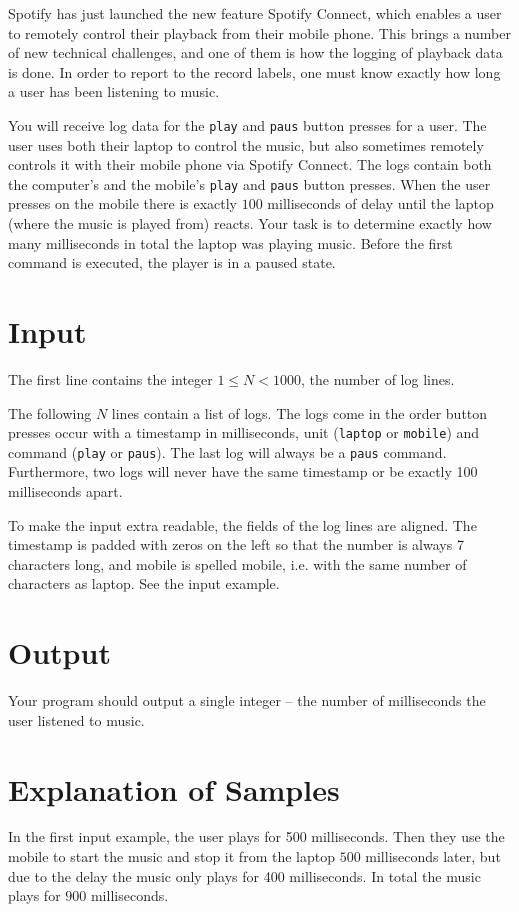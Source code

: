 
Spotify has just launched the new feature Spotify Connect, which enables a
user to remotely control their playback from their mobile phone. This brings a
number of new technical challenges, and one of them is how the logging of playback data is done.
In order to report to the record labels, one must know exactly how long
a user has been listening to music.

You will receive log data for the \texttt{play} and \texttt{paus} button presses
for a user. The user uses both their laptop to control the music, but
also sometimes remotely controls it with their mobile phone via Spotify Connect. The logs contain both
the computer's and the mobile's \texttt{play} and \texttt{paus} button presses. When the user presses
on the mobile there is exactly $100$ milliseconds of delay until the laptop
(where the music is played from) reacts. Your task is to
determine exactly how many milliseconds in total the laptop was playing music.
Before the first command is executed, the player is in a paused state.

\section*{Input}
The first line contains the integer $1 \le N < 1000$, the number of log lines.

The following $N$ lines contain a list of logs. The logs come
in the order button presses occur with a timestamp in milliseconds, unit
(\texttt{laptop} or \texttt{mobile}) and command (\texttt{play} or \texttt{paus}). The
last log will
always be a \texttt{paus} command. Furthermore, two logs will never have the same
timestamp or be exactly 100 milliseconds apart.

To make the input extra readable, the fields of the log lines are
aligned. The timestamp is padded with zeros on the left so that the number
is always 7 characters long, and mobile is spelled mobile, i.e. with the same
number of characters as laptop. See the input example.

\section*{Output}
Your program should output a single integer -- the number of milliseconds the user listened to music.

\section*{Explanation of Samples}
In the first input example, the user plays for 500 milliseconds. Then they use
the mobile to start the music and stop it from the laptop $500$ milliseconds
later, but due to the delay the music only plays for 400 milliseconds.
In total the music plays for $900$ milliseconds.

